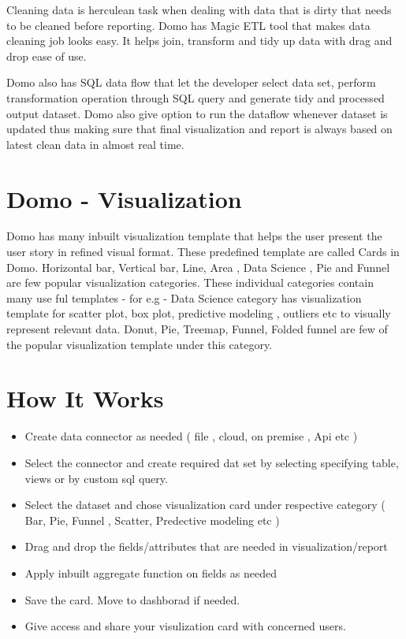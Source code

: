 Cleaning data is herculean task when dealing with data that 
is dirty that needs to be cleaned before reporting. Domo has 
Magic ETL tool that makes data cleaning job looks easy. 
It helps join, transform and tidy up data with drag and 
drop ease of use. 

Domo also has SQL data flow that let the developer select 
data set, perform transformation operation through SQL query 
and generate tidy and processed output dataset. Domo also 
give option to run the dataflow whenever dataset is updated 
thus making sure that final visualization and report is 
always based on latest clean data in almost real time.


\section{Domo - Visualization}

Domo has many inbuilt visualization template that helps the 
user present the user story in refined visual format.
These predefined template are called Cards in Domo. Horizontal bar, 
Vertical bar, Line, Area , Data Science , Pie and Funnel are 
few popular visualization categories. These individual categories 
contain many use ful templates - for e.g - Data Science category 
has visualization template for scatter plot, box plot, predictive 
modeling , outliers etc to visually represent relevant data. 
Donut, Pie, Treemap, Funnel, Folded funnel are few of the
popular visualization template under this category.



\section{How It Works}
\begin{itemize}
\item Create data connector as needed 
( file , cloud, on premise , Api etc )
\item Select the connector and create required dat set by 
selecting specifying table, views or by custom sql query.
\item Select the dataset and chose visualization card under 
respective category ( Bar, Pie, Funnel , Scatter, 
Predective modeling etc )
\item Drag and drop the fields/attributes that are needed 
in visualization/report 
\item Apply inbuilt aggregate function on fields as needed 
\item Save the card. Move to dashborad if needed.
\item Give access and share your visulization card with concerned users.

\end{itemize}

